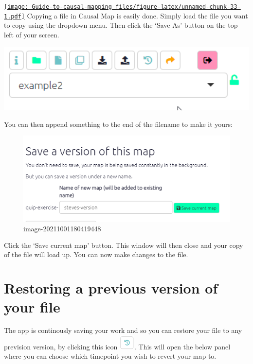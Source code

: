 \documentclass[
]{book}
\begin{document}
\href{https://player.vimeo.com/video/641927229}{\texttt{[image: Guide-to-causal-mapping\_files/figure-latex/unnamed-chunk-33-1.pdf]}}
Copying a file in Causal Map is easily done. Simply load the file you want to copy using the dropdown menu. Then click the `Save As' button on the top left of your screen.

\includegraphics[width=6.77083in,height=\textheight]{_assets/5Najfi4Pr2.gif}

You can then append something to the end of the filename to make it yours:

\begin{figure}
\centering
\includegraphics[width=6.77083in,height=\textheight]{_assets/image-20211001180419448.png}
\caption{image-20211001180419448}
\end{figure}

Click the `Save current map' button. This window will then close and your copy of the file will load up. You can now make changes to the file.

\hypertarget{restoring-a-previous-version-of-your-file}{%
\section{Restoring a previous version of your file}\label{restoring-a-previous-version-of-your-file}}

The app is continously saving your work and so you can restore your file to any prevision version, by clicking this icon \includegraphics{_assets/image-20211115175030770.png}. This will open the below panel where you can choose which timepoint you wish to revert your map to.
\end{document}
